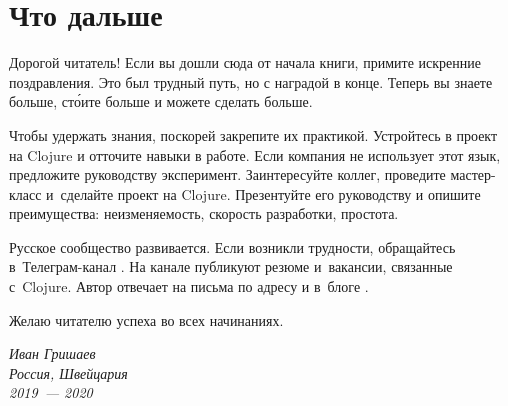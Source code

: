 \chapter{Что дальше}

Дорогой читатель! Если вы дошли сюда от начала книги, примите искренние
поздравления. Это был трудный путь, но с наградой в конце. Теперь вы знаете
больше, ст\'{о}ите больше и можете сделать больше.

Чтобы удержать знания, поскорей закрепите их практикой. Устройтесь в проект на
Clojure и отточите навыки в работе. Если компания не использует этот язык,
предложите руководству эксперимент. Заинтересуйте коллег, проведите мастер-класс
и~сделайте проект на Clojure. Презентуйте его руководству и опишите
преимущества: неизменяемость, скорость разработки, простота.

Русское сообщество развивается. Если возникли трудности, обращайтесь
в~Телеграм-канал . На канале  публикуют
резюме и~вакансии, связанные с~Clojure. Автор отвечает на письма по адресу
\emaillink\xspace и в~блоге \sitelink.

Желаю читателю успеха во всех начинаниях.

\vspace{1em}

\noindent
\textit{Иван Гришаев\\Россия, Швейцария\\2019~--- 2020}
